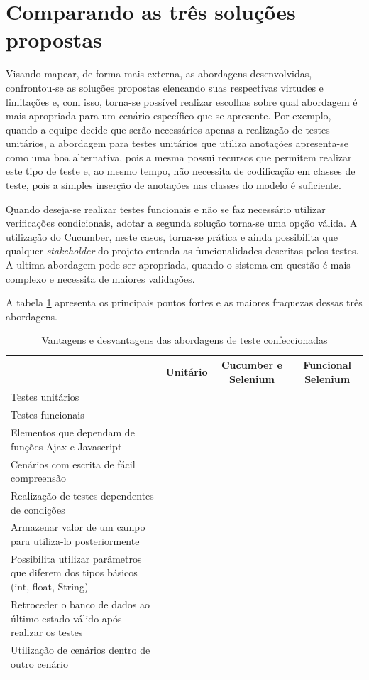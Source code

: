 \documentclass[tg]{mdtufsm}
\begin{document}
\section{Comparando as três soluções propostas}
Visando mapear, de forma mais externa, as abordagens desenvolvidas, confrontou-se as soluções propostas elencando suas respectivas virtudes e limitações e, com isso, torna-se possível realizar escolhas sobre qual abordagem é mais apropriada para um cenário específico que se apresente.
Por exemplo, quando a equipe decide que serão necessários apenas a realização de testes unitários, a abordagem para testes unitários que utiliza anotações apresenta-se como uma boa alternativa, pois a mesma possui recursos que permitem realizar este tipo de teste e, ao mesmo tempo, não necessita de codificação em classes de teste, pois a simples inserção de anotações nas classes do modelo é suficiente.

Quando deseja-se realizar testes funcionais e não se faz necessário utilizar verificações condicionais, adotar a segunda solução torna-se uma opção válida. A utilização do Cucumber, neste casos, torna-se prática e ainda possibilita que qualquer \emph{stakeholder} do projeto entenda as funcionalidades descritas pelos testes.
A ultima abordagem pode ser apropriada, quando o sistema em questão é mais complexo e necessita de maiores validações.

A tabela \ref{tab:comparacaoSolucoes} apresenta os principais pontos fortes e as maiores fraquezas dessas três abordagens.

\begin{table}[!htpb]
	\centering
	\begin{tabular}{p{5cm}|c|c|c}
		& Unitário & Cucumber e Selenium & Funcional Selenium\\ \hline
		Testes unitários & \checkmark & \checkmark & \checkmark \\ \hline
		Testes funcionais &  & \checkmark & \checkmark \\ \hline
		Elementos que dependam de funções Ajax e Javascript & & \checkmark & \checkmark \\ \hline
		Cenários com escrita de fácil compreensão & & \checkmark & \\ \hline
		Realização de testes dependentes de condições & & & \checkmark \\ \hline
		Armazenar valor de um campo para utiliza-lo posteriormente & & & \checkmark \\ \hline
		Possibilita utilizar parâmetros que diferem dos tipos básicos (int, float, String) & \checkmark & & \checkmark \\ \hline
		Retroceder o banco de dados ao último estado válido após realizar os testes & & & \\ \hline
		Utilização de cenários dentro de outro cenário & & & \checkmark \\ \hline
	\end{tabular}
	\caption{Vantagens e desvantagens das abordagens de teste confeccionadas}
	\label{tab:comparacaoSolucoes}
\end{table}
\end{document}
